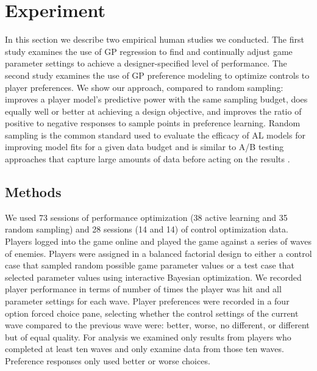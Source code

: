 \documentclass{sig-alternate}
\begin{document}
\section{Experiment}
In this section we describe two empirical human studies we conducted. The first study examines the use of GP regression to find and continually adjust game parameter settings to achieve a designer-specified level of performance. The second study examines the use of GP preference modeling to optimize controls to player preferences. We show our approach, compared to random sampling: improves a player model's predictive power with the same sampling budget, does equally well or better at achieving a design objective, and improves the ratio of positive to negative responses to sample points in preference learning. Random sampling is the common standard used to evaluate the efficacy of AL models for improving model fits for a given data budget and is similar to A/B testing approaches that capture large amounts of data before acting on the results \cite{settles2012:al-book}.


\subsection{Methods}
We used 73 sessions of performance optimization (38 active learning and 35 random sampling) and 28 sessions (14 and 14) of control optimization data. Players logged into the game online and played the game against a series of waves of enemies. Players were assigned in a balanced factorial design to either a control case that sampled random possible game parameter values or a test case that selected parameter values using interactive Bayesian optimization.
We recorded player performance in terms of number of times the player was hit and all parameter settings for each wave. Player preferences were recorded in a four option forced choice pane, selecting whether the control settings of the current wave compared to the previous wave were: better, worse, no different, or different but of equal quality.
For analysis we examined only results from players who completed at least ten waves and only examine data from those ten waves. Preference responses only used better or worse choices.
\end{document}
